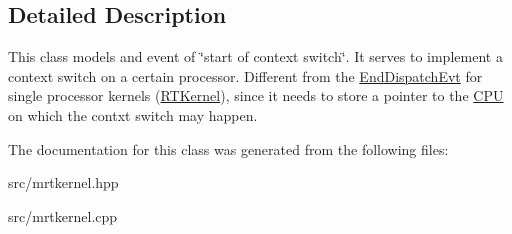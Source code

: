 \subsection{Detailed Description}
This class models and event of \char`\"{}start of context switch\char`\"{}. It serves to implement a context switch on a certain processor. Different from the \hyperlink{classRTSim_1_1EndDispatchEvt}{End\+Dispatch\+Evt} for single processor kernels (\hyperlink{classRTSim_1_1RTKernel}{R\+T\+Kernel}), since it needs to store a pointer to the \hyperlink{classRTSim_1_1CPU}{C\+PU} on which the contxt switch may happen. 

The documentation for this class was generated from the following files\+:\begin{DoxyCompactItemize}
\item 
src/mrtkernel.\+hpp\item 
src/mrtkernel.\+cpp\end{DoxyCompactItemize}
